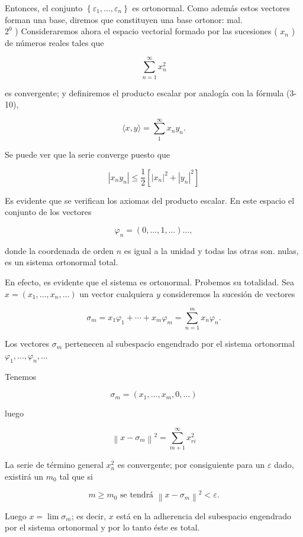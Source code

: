 \documentclass[10pt]{article}
\theoremstyle{plain}
\theoremstyle{definition}
\theoremstyle{remark}
\begin{document}
Entonces, el conjunto $\left\{\varepsilon_{1}, \ldots, \varepsilon_{n}\right\}$ es ortonormal. Como además estos vectores forman una base, diremos que constituyen una base ortonor: mal.\\
$2^{0}$ ) Consideraremos ahora el espacio vectorial formado por las sucesiones ( $x_{n}$ ) de números reales tales que

$$
\sum_{n=1}^{\infty} x_{n}^{2}
$$

es convergente; y definiremos el producto escalar por analogía con la fórmula (3-10),


\begin{equation*}
\langle x, y\rangle=\sum_{1}^{\infty} x_{n} y_{n} . \tag{3-12}
\end{equation*}


Se puede ver que la serie converge puesto que

$$
\left|x_{n} y_{n}\right| \leqslant \frac{1}{2}\left[\left|x_{n}\right|^{2}+\left|y_{n}\right|^{2}\right]
$$

Es evidente que se verifican los axiomas del producto escalar. En este espacio el conjunto de los vectores

$$
\varphi_{n}=(0, \ldots, 1, \ldots) \ldots,
$$

donde la coordenada de orden $n$ es igual a la unidad y todas las otras son. nulas, es un sistema ortonormal total.

En efecto, es evidente que el sistema es ortonormal. Probemos su totalidad. Sea $x=\left(x_{1}, \ldots, x_{n}, \ldots\right)$ un vector cualquiera $y$ consideremos la sucesión de vectores

$$
\sigma_{m}=x_{1} \varphi_{1}+\cdots+x_{m} \varphi_{m}=\sum_{n=1}^{m} x_{n} \varphi_{n} .
$$

Los vectores $\sigma_{m}$ pertenecen al subespacio engendrado por el sistema ortonormal $\varphi_{1}, \ldots, \varphi_{n}, \ldots$

Tenemos

$$
\sigma_{m}=\left(x_{1}, \ldots, x_{m}, 0, \ldots\right)
$$

luego

$$
\left\|x-\sigma_{m}\right\|^{2}=\sum_{m+1}^{\infty} x_{r i}^{2}
$$

La serie de término general $x_{n}^{2}$ es convergente; por consiguiente para un $\varepsilon$ dado, existirá un $m_{0}$ tal que si

$$
m \geqslant m_{0} \text { se tendrá }\left\|x-\sigma_{m}\right\|^{2}<\varepsilon .
$$

Luego $x=\lim \sigma_{m}$; es decir, $x$ está en la adherencia del subespacio engendrado por el sistema ortonormal y por lo tanto éste es total.
\end{document}
